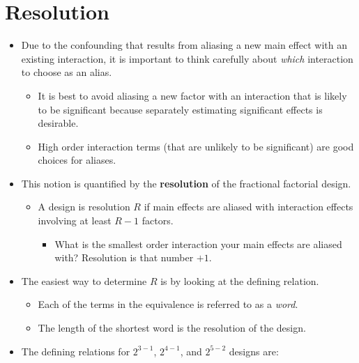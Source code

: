 \section{Resolution}
\begin{itemize}[*]
    \item Due to the confounding that results from aliasing a new main effect with an existing interaction, it is
          important to think carefully about \emph{which} interaction to choose as an alias.
          \begin{itemize}[*]
              \item It is best to avoid aliasing a new factor with an interaction that is likely to be significant because
                    separately estimating significant effects is desirable.
          \end{itemize}
          \begin{itemize}
              \item High order interaction terms (that are unlikely to be significant) are good choices for aliases.
          \end{itemize}
    \item This notion is quantified by the \textbf{resolution} of the fractional factorial design.
          \begin{itemize}[$\rightarrow$]
              \item A design is resolution $R$ if main effects are aliased with interaction effects involving at least $R - 1$ factors.
                    \begin{itemize}[label={}]
                        \item What is the smallest order interaction your main effects are aliased with? Resolution is that number $ +1 $.
                    \end{itemize}
          \end{itemize}
    \item The easiest way to determine $R$ is by looking at the defining relation.
          \begin{itemize}
              \item Each of the terms in the equivalence is referred to as a \emph{word}.
          \end{itemize}
          \begin{itemize}[$\rightarrow$]
              \item The length of the shortest word is the resolution of the design.
          \end{itemize}
    \item The defining relations for $ 2^{3-1} $, $ 2^{4-1} $, and $ 2^{5-2} $ designs are:

\end{itemize}
